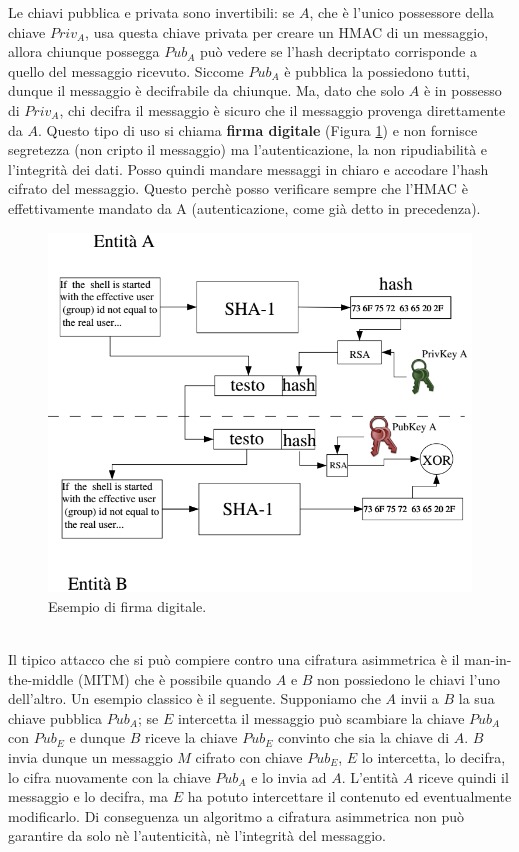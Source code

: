 Le chiavi pubblica e privata sono invertibili: se $A$, che è l'unico possessore della chiave $Priv_A$, usa questa chiave privata per creare un HMAC di un messaggio, allora chiunque possegga $Pub_A$ può vedere se l'hash decriptato corrisponde a quello del messaggio ricevuto. Siccome $Pub_A$ è pubblica la possiedono tutti, dunque il messaggio è decifrabile da chiunque. Ma, dato che solo $A$ è in possesso di $Priv_A$, chi decifra il messaggio è sicuro che il messaggio provenga direttamente da $A$. Questo tipo di uso si chiama \textbf{firma digitale} (Figura \ref{img:digital_signature}) e non fornisce segretezza (non cripto il messaggio) ma l'autenticazione, la non ripudiabilità e l'integrità dei dati. Posso quindi mandare messaggi in chiaro e accodare l'hash cifrato del messaggio. Questo perchè posso verificare sempre che l'HMAC è effettivamente mandato da A (autenticazione, come già detto in precedenza).
\begin{figure}[htbp]
	\centering
	\includegraphics[scale = 0.5]{images/digital_signature}
	\caption{Esempio di firma digitale.}
	\label{img:digital_signature}
\end{figure}\\
Il tipico attacco che si può compiere contro una cifratura asimmetrica è il man-in-the-middle (MITM) che è possibile quando $A$ e $B$ non possiedono le chiavi l'uno dell'altro. Un esempio classico è il seguente. Supponiamo che $A$ invii a $B$ la sua chiave pubblica $Pub_A$; se $E$ intercetta il messaggio può scambiare la chiave $Pub_A$ con $Pub_E$ e dunque $B$ riceve la chiave $Pub_E$ convinto che sia la chiave di $A$. $B$ invia dunque un messaggio $M$ cifrato con chiave $Pub_E$, $E$ lo intercetta, lo decifra, lo cifra nuovamente con la chiave $Pub_A$ e lo invia ad $A$. L'entità $A$ riceve quindi il messaggio e lo decifra, ma $E$ ha potuto intercettare il contenuto ed eventualmente modificarlo. Di conseguenza un algoritmo a cifratura asimmetrica non può garantire da solo nè l'autenticità, nè l'integrità del messaggio.


